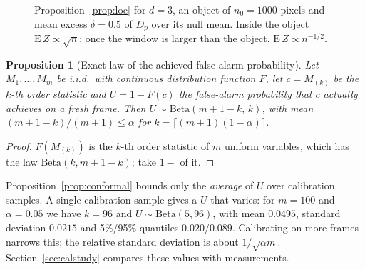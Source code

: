 \documentclass[11pt,a4paper]{article}
\newtheorem{proposition}{Proposition}
\theoremstyle{definition}
\begin{document}
\begin{figure}[t]
\centering
{}
\caption{Proposition~\ref{prop:loc} for $d=3$, an object of $n_0=1000$ pixels and mean excess $\delta=0.5$ of $D_p$ over its null mean. Inside the object $\mathrm{E}\,Z\propto\sqrt n$; once the window is larger than the object, $\mathrm{E}\,Z\propto n^{-1/2}$.}
\label{fig:loc}
\end{figure}

\begin{proposition}[Exact law of the achieved false-alarm probability]\label{prop:beta}
Let $M_1,\dots,M_m$ be i.i.d.\ with continuous distribution function $F$, let $c=M_{(k)}$ be the $k$-th order statistic and $U=1-F(c)$ the false-alarm probability that $c$ actually achieves on a fresh frame. Then $U\sim\mathrm{Beta}(m+1-k,\,k)$, with mean $(m+1-k)/(m+1)\le\alpha$ for $k=\lceil(m+1)(1-\alpha)\rceil$.
\end{proposition}
\begin{proof}
$F(M_{(k)})$ is the $k$-th order statistic of $m$ uniform variables, which has the law $\mathrm{Beta}(k,m+1-k)$; take $1-$ of it.
\end{proof}
Proposition~\ref{prop:conformal} bounds only the \emph{average} of $U$ over calibration samples. A single calibration sample gives a $U$ that varies: for $m=100$ and $\alpha=0.05$ we have $k=96$ and $U\sim\mathrm{Beta}(5,96)$, with mean $0.0495$, standard deviation $0.0215$ and 5\%/95\% quantiles $0.020$/$0.089$. Calibrating on more frames narrows this; the relative standard deviation is about $1/\sqrt{\alpha m}$. Section~\ref{sec:calstudy} compares these values with measurements.
\end{document}
